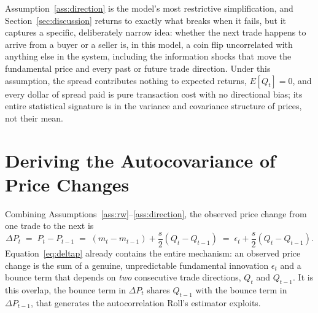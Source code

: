 \documentclass[11pt]{article}
\theoremstyle{remark}
\theoremstyle{definition}
\begin{document}
Assumption~\ref{ass:direction} is the model's most restrictive simplification, and Section~\ref{sec:discussion} returns to exactly what breaks when it fails, but it captures a specific, deliberately narrow idea: whether the next trade happens to arrive from a buyer or a seller is, in this model, a coin flip uncorrelated with anything else in the system, including the information shocks that move the fundamental price and every past or future trade direction. Under this assumption, the spread contributes nothing to expected returns, $E[Q_t]=0$, and every dollar of spread paid is pure transaction cost with no directional bias; its entire statistical signature is in the variance and covariance structure of prices, not their mean.

\section{Deriving the Autocovariance of Price Changes}
\label{sec:derivation}

Combining Assumptions~\ref{ass:rw}--\ref{ass:direction}, the observed price change from one trade to the next is
\begin{equation}
\Delta P_t \;=\; P_t - P_{t-1} \;=\; (m_t - m_{t-1}) + \frac{s}{2}(Q_t - Q_{t-1}) \;=\; \epsilon_t + \frac{s}{2}(Q_t - Q_{t-1}).
\label{eq:deltap}
\end{equation}
Equation~\eqref{eq:deltap} already contains the entire mechanism: an observed price change is the sum of a genuine, unpredictable fundamental innovation $\epsilon_t$ and a bounce term that depends on \emph{two} consecutive trade directions, $Q_t$ and $Q_{t-1}$. It is this overlap, the bounce term in $\Delta P_t$ shares $Q_{t-1}$ with the bounce term in $\Delta P_{t-1}$, that generates the autocorrelation Roll's estimator exploits.
\end{document}
